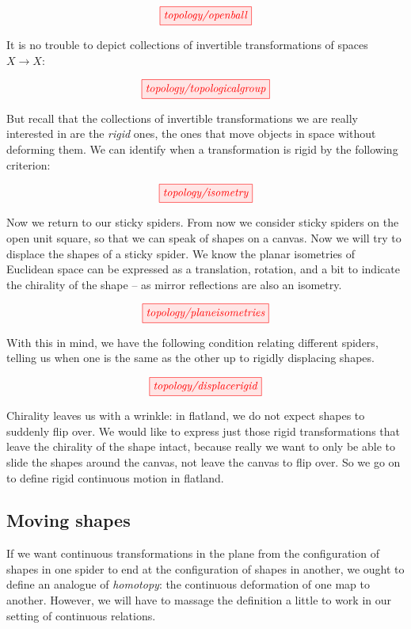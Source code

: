 \begin{fullwidth}
\[\tikzfig{topology/openball}\]


It is no trouble to depict collections of invertible transformations of spaces $X \rightarrow X$:

\[\tikzfig{topology/topologicalgroup}\]


But recall that the collections of invertible transformations we are really interested in are the \emph{rigid} ones, the ones that move objects in space without deforming them. We can identify when a transformation is rigid by the following criterion:

\[\tikzfig{topology/isometry}\]


Now we return to our sticky spiders. From now we consider sticky spiders on the open unit square, so that we can speak of shapes on a canvas. Now we will try to displace the shapes of a sticky spider. We know the planar isometries of Euclidean space can be expressed as a translation, rotation, and a bit to indicate the chirality of the shape -- as mirror reflections are also an isometry.

\[\tikzfig{topology/planeisometries}\]

With this in mind, we have the following condition relating different spiders, telling us when one is the same as the other up to rigidly displacing shapes.

\[\tikzfig{topology/displacerigid}\]

Chirality leaves us with a wrinkle: in flatland, we do not expect shapes to suddenly flip over. We would like to express just those rigid transformations that leave the chirality of the shape intact, because really we want to only be able to slide the shapes around the canvas, not leave the canvas to flip over. So we go on to define rigid continuous motion in flatland.

\subsection{Moving shapes}\label{sec:moving}

If we want continuous transformations in the plane from the configuration of shapes in one spider to end at the configuration of shapes in another, we ought to define an analogue of \emph{homotopy}: the continuous deformation of one map to another. However, we will have to massage the definition a little to work in our setting of continuous relations.


\end{fullwidth}
